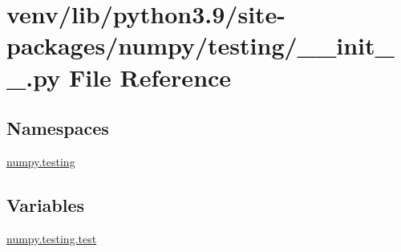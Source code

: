 \hypertarget{venv_2lib_2python3_89_2site-packages_2numpy_2testing_2____init_____8py}{}\section{venv/lib/python3.9/site-\/packages/numpy/testing/\+\_\+\+\_\+init\+\_\+\+\_\+.py File Reference}
\label{venv_2lib_2python3_89_2site-packages_2numpy_2testing_2____init_____8py}
\subsection*{Namespaces}
\begin{DoxyCompactItemize}
\item 
 \hyperlink{namespacenumpy_1_1testing}{numpy.\+testing}
\end{DoxyCompactItemize}
\subsection*{Variables}
\begin{DoxyCompactItemize}
\item 
\hyperlink{namespacenumpy_1_1testing_a6e95cdd7f4d6021fbb8519b9f868c27b}{numpy.\+testing.\+test}
\end{DoxyCompactItemize}
